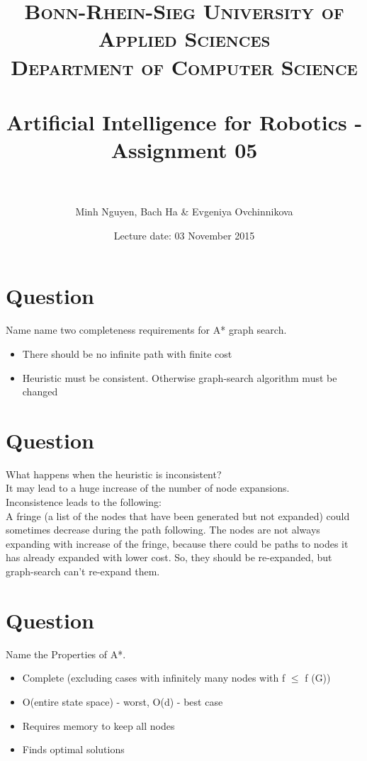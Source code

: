 \documentclass[paper=a4, fontsize=11pt]{scrartcl} %
\title{	
\normalfont \normalsize 
\textsc{Bonn-Rhein-Sieg University of Applied Sciences \\Department of Computer Science} \\ [10pt] %
\horrule{0.5pt} \\[0.4cm] %
\LARGE Artificial Intelligence for Robotics - Assignment 05 \\ %
\horrule{2pt} \\[0.5cm] %
}
\date{}
\author{Minh Nguyen, Bach Ha \& Evgeniya Ovchinnikova} %
\date{Lecture date: 03 November 2015}
\begin{document}
\maketitle %


\section{Question}

Name name two completeness requirements for A* graph search. \\

\begin{itemize}
\item There should be no infinite path with finite cost
\item Heuristic must be consistent. Otherwise graph-search algorithm must be changed
\end{itemize}


\section{Question}


What happens when the heuristic is inconsistent? \\


It may lead to a huge increase of the number of node expansions. \\
Inconsistence leads to the following:\\
A fringe (a list of the nodes that have been generated but not expanded) could sometimes decrease during the path following.
The nodes are not always expanding with increase of the fringe, because there could be paths to nodes it has already expanded with lower cost. So, they should be re-expanded, but graph-search can't re-expand them.

\section{Question}

Name the Properties of A*.\\

\begin{itemize}
\item Complete (excluding cases with infinitely many nodes with f $\le$ f (G))
\item O(entire state space) - worst, O(d) - best case
\item Requires memory to keep all nodes
\item Finds optimal solutions
\end{itemize}
\end{document}
